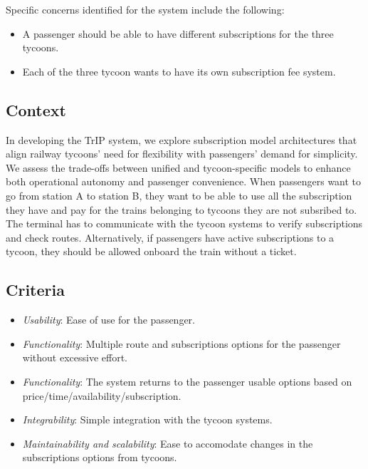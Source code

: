 Specific concerns identified for the system include the following:
\begin{itemize}
    \item A passenger should be able to have different subscriptions for the three tycoons.
    \item Each of the three tycoon wants to have its own subscription fee system.
\end{itemize}

\subsection*{Context}
In developing the TrIP system, we explore subscription model architectures that align railway tycoons' need for flexibility with passengers' demand for simplicity. 
We assess the trade-offs between unified and tycoon-specific models to enhance both operational autonomy and passenger convenience.
When passengers want to go from station A to station B, they want to be able to use all the subscription they have and pay for the trains belonging to tycoons they are not subsribed to.
The terminal has to communicate with the tycoon systems to verify subscriptions and check routes.
Alternatively, if passengers have active subscriptions to a tycoon, they should be allowed onboard the train without a ticket. 

\subsection*{Criteria}
\begin{itemize}[noitemsep]
    \item \textit{Usability}: Ease of use for the passenger.
    \item \textit{Functionality}: Multiple route and subscriptions options for the passenger without excessive effort.
    \item \textit{Functionality}: The system returns to the passenger usable options based on price/time/availability/subscription.
    \item \textit{Integrability}: Simple integration with the tycoon systems.
    \item \textit{Maintainability and scalability}: Ease to accomodate changes in the subscriptions options from tycoons.
\end{itemize}

